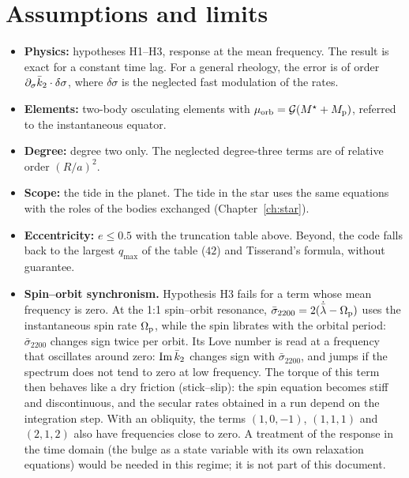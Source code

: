 \section{Assumptions and limits}\label{sec:limits}
\begin{itemize}
  \item \textbf{Physics:} hypotheses H1--H3, response at the mean frequency. The result is exact for a constant time lag. For a general rheology, the error is of order $\partial_\sigma\bar k_2\cdot\delta\sigma$, where $\delta\sigma$ is the neglected fast modulation of the rates.
  \item \textbf{Elements:} two-body osculating elements with $\mu_{\rm orb}=\mathcal{G}(M^\star+M_{\mathrm p})$, referred to the instantaneous equator.
  \item \textbf{Degree:} degree two only. The neglected degree-three terms are of relative order $(R/a)^2$.
  \item \textbf{Scope:} the tide in the planet. The tide in the star uses the same equations with the roles of the bodies exchanged (Chapter~\ref{ch:star}).
  \item \textbf{Eccentricity:} $e\le0.5$ with the truncation table above. Beyond, the code falls back to the largest $q_{\max}$ of the table ($42$) and Tisserand's formula, without guarantee.
  \item \textbf{Spin--orbit synchronism.} Hypothesis H3 fails for a term whose mean frequency is zero. At the 1:1 spin--orbit resonance, $\bar\sigma_{2200}=2(\dot{\bar\lambda}-\Omega_{\mathrm p})$ uses the instantaneous spin rate $\Omega_{\mathrm p}$, while the spin librates with the orbital period: $\bar\sigma_{2200}$ changes sign twice per orbit. Its Love number is read at a frequency that oscillates around zero: $\operatorname{Im}\bar k_2$ changes sign with $\bar\sigma_{2200}$, and jumps if the spectrum does not tend to zero at low frequency. The torque of this term then behaves like a dry friction (stick--slip): the spin equation becomes stiff and discontinuous, and the secular rates obtained in a run depend on the integration step. With an obliquity, the terms $(1,0,-1)$, $(1,1,1)$ and $(2,1,2)$ also have frequencies close to zero. A treatment of the response in the time domain (the bulge as a state variable with its own relaxation equations) would be needed in this regime; it is not part of this document.
\end{itemize}
